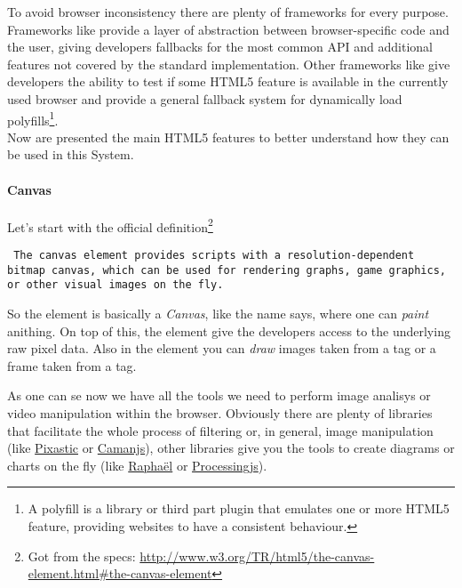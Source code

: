 To avoid browser inconsistency there are plenty of \js{} frameworks for every
purpose. Frameworks like  provide a layer of abstraction between
browser-specific code and the user, giving developers \js{} fallbacks for the most
common API and additional features not covered by the standard implementation.
Other frameworks like  give developers the ability to test
if some \ac{HTML}5 feature is available in the currently used browser and provide
a general fallback system for dynamically load polyfills\footnote{A polyfill is
a \js{} library or third part plugin that emulates one or more HTML5 feature,
providing websites to have a consistent behaviour.}.\\


Now are presented the main \ac{HTML}5 features to better understand how they can
be used in this System.





\paragraph{Canvas}
Let's start with the official definition\footnote{Got from the specs:
\url{http://www.w3.org/TR/html5/the-canvas-element.html\#the-canvas-element}}
\begin{quoting}\rm\tt
	The canvas element provides scripts with a resolution-dependent bitmap canvas, which can
	be used for rendering graphs, game graphics, or other visual images on the fly.
\end{quoting}

So the  element is basically a \emph{Canvas}, like the name says, where
one can \emph{paint} anithing. On top of this, the  element give
the developers access to the underlying raw pixel data. Also in the 
element you can \emph{draw} images taken from a  tag or a frame taken
from a  tag.

As one can se now we have all the tools we need to perform image analisys or
video manipulation within the browser. Obviously there are plenty of \js{}
libraries that facilitate the whole process of filtering or, in general, image
manipulation (like \href{http://www.pixastic.com/}{Pixastic} or
\href{http://camanjs.com/}{Camanjs}), other libraries give you the tools to
create diagrams or charts on the fly (like \href{http://raphaeljs.com/}{Raphaël}
or \href{http://processingjs.org/}{Processingjs}).


